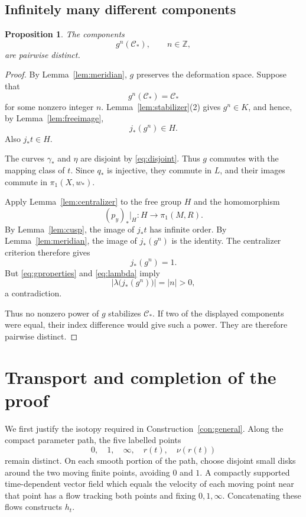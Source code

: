 \documentclass[11pt]{article}
\newcommand{\Z}{\mathbb Z}
\newtheorem{proposition}[theorem]{Proposition}
\theoremstyle{definition}
\theoremstyle{remark}
\begin{document}
\subsection{Infinitely many different components}

\begin{proposition}\label{prop:model}
The components
\[
g^n(\mathcal C_*),\qquad n\in\Z,
\]
are pairwise distinct.
\end{proposition}

\begin{proof}
By Lemma~\ref{lem:meridian}, $g$ preserves the deformation space.
Suppose that
\[
g^n(\mathcal C_*)=\mathcal C_*
\]
for some nonzero integer $n$.  Lemma~\ref{lem:stabilizer}(2) gives
$g^n\in K$, and hence, by Lemma~\ref{lem:freeimage},
\[
j_*(g^n)\in H.
\]
Also $j_*t\in H$.

The curves $\gamma_*$ and $\eta$ are disjoint by
\eqref{eq:disjoint}.  Thus $g$ commutes with the mapping class of
$t$.  Since $q_*$ is injective, they commute in $L$, and their images
commute in $\pi_1(X,w_*)$.

Apply Lemma~\ref{lem:centralizer} to the free group $H$ and the
homomorphism
\[
(p_y)_*|_H:H\longrightarrow\pi_1(M,R).
\]
By Lemma~\ref{lem:cusp}, the image of $j_*t$ has infinite order.
By Lemma~\ref{lem:meridian}, the image of $j_*(g^n)$ is the identity.
The centralizer criterion therefore gives
\[
j_*(g^n)=1.
\]
But \eqref{eq:gproperties} and \eqref{eq:lambda} imply
\[
\left|\lambda\bigl(j_*(g^n)\bigr)\right|=|n|>0,
\]
a contradiction.

Thus no nonzero power of $g$ stabilizes $\mathcal C_*$.
If two of the displayed components were equal, their index
difference would give such a power.  They are therefore pairwise
distinct.
\end{proof}

\section{Transport and completion of the proof}\label{sec:transport}

We first justify the isotopy required in
Construction~\ref{con:general}.
Along the compact parameter path, the five labelled points
\[
0,\quad1,\quad\infty,\quad r(t),\quad\nu(r(t))
\]
remain distinct.  On each smooth portion of the path, choose disjoint
small disks around the two moving finite points, avoiding $0$ and $1$.
A compactly supported time-dependent vector field which equals the
velocity of each moving point near that point has a flow tracking
both points and fixing $0,1,\infty$.  Concatenating these flows
constructs $h_t$.
\end{document}
